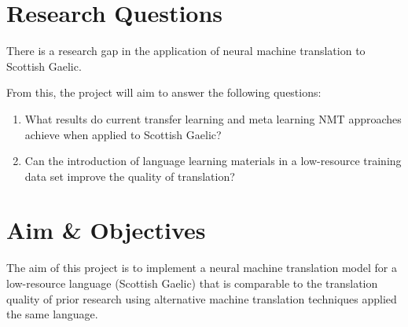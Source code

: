 
\section{Research Questions}
There is a research gap in the application of neural machine translation to Scottish Gaelic.

From this, the project will aim to answer the following questions:

\begin{enumerate}
    \item What results do current transfer learning and meta learning \acrshort{NMT} approaches achieve when applied to Scottish Gaelic?
    \item Can the introduction of language learning materials in a low-resource training data set improve the quality of translation?
\end{enumerate}
\section{Aim \& Objectives}
The aim of this project is to implement a neural machine translation model for a low-resource language (Scottish Gaelic) that is comparable to the translation quality of prior research using alternative machine translation techniques applied the same language.

